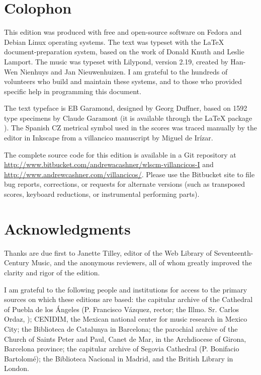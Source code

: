\section*{Colophon}

This edition was produced with free and open-source software on Fedora and
Debian Linux operating systems.
The text was typeset with the \LaTeX{} document-preparation system, based on 
the work of Donald Knuth and Leslie Lamport.
The music was typeset with Lilypond, version 2.19, created by Han-Wen Nienhuys
and Jan Nieuwenhuizen.
I am grateful to the hundreds of volunteers who build and maintain these 
systems, and to those who provided specific help in programming this document.

The text typeface is EB Garamond, designed by Georg Duffner, based on 1592 type 
specimens by Claude Garamont (it is available through the \LaTeX{} package
).
The Spanish CZ metrical symbol used in the scores was traced manually by the
editor in Inkscape from a villancico manuscript by Miguel de Irízar.

The complete source code for this edition is available in a Git repository at
\url{http://www.bitbucket.com/andrewacashner/wlscm-villancicos-I} and
\url{http://www.andrewcashner.com/villancicos/}.
Please use the Bitbucket site to file bug reports, corrections, or requests for
alternate versions (such as transposed scores, keyboard reductions, or
instrumental performing parts).


\section*{Acknowledgments}

Thanks are due first to Janette Tilley, editor of the Web Library of
Seventeenth-Century Music, and the anonymous reviewers, all of whom greatly
improved the clarity and rigor of the edition.

I am grateful to the following people and institutions for access to the 
primary sources on which these editions are based: 
the capitular archive of the Cathedral of Puebla de los Ángeles (P. Francisco 
Vázquez, rector; the Illmo. Sr. Carlos Ordaz, );
CENIDIM, the Mexican national center for music research in Mexico City;
the Biblioteca de Catalunya in Barcelona;
the parochial archive of the Church of Saints Peter and Paul, Canet de Mar, in 
the Archdiocese of Girona, Barcelona province;
the capitular archive of Segovia Cathedral (P. Bonifacio Bartolomé);
the Biblioteca Nacional in Madrid, and
the British Library in London.

